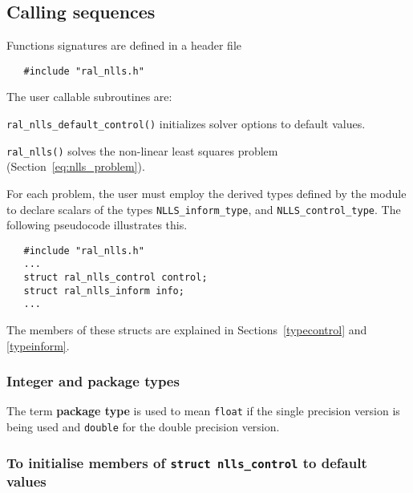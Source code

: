 \documentclass{spec}
\begin{document}
\newpage
\hslhowto

\subsection{Calling sequences}

Functions signatures are defined in a header file
\begin{verbatim}
   #include "ral_nlls.h"
\end{verbatim}
\medskip

\noindent The user callable subroutines are:
\vspace{-0.1cm}
\begin{description}
   \item {\tt ral\_nlls\_default\_control()} initializes solver options to default values.
   \item {\tt ral\_nlls()}  solves the non-linear least squares problem (Section~\ref{eq:nlls_problem}).
\end{description}


\hsltypes
\label{derived types}
For each problem, the user must employ the derived types defined by the
module to declare scalars of the types {\tt NLLS\_inform\_type}, and
{\tt NLLS\_control\_type}.
The following pseudocode illustrates this.
\begin{verbatim}
   #include "ral_nlls.h"
   ...
   struct ral_nlls_control control;
   struct ral_nlls_inform info;
   ...
\end{verbatim}
The members of these structs are explained
in Sections~\ref{typecontrol} and \ref{typeinform}. 


\hslarguments

\subsubsection{Integer and package types}
The term {\bf package type} is used to mean \texttt{float}
if the single precision version is being used and
\texttt{double} for the double precision version.

\subsubsection{To initialise members of \texttt{struct nlls\_control} to default values}
\end{document}
